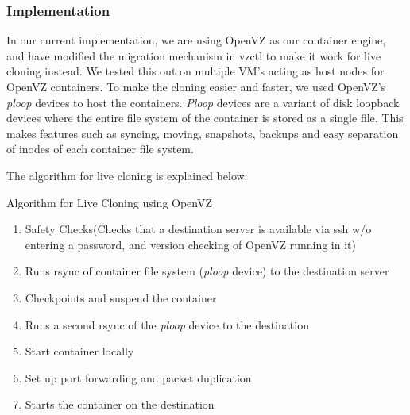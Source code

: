 
\subsubsection{Implementation}
In our current implementation, we are using OpenVZ\cite{openvz} as our container engine, and have modified the migration mechanism in vzctl \cite{vzctl} to make it work for live cloning instead. 
We tested this out on multiple VM's acting as host nodes for OpenVZ containers. 
To make the cloning easier and faster, we used OpenVZ's \textit{ploop} devices \cite{ploop} to host the containers. 
\textit{Ploop} devices are a variant of disk loopback devices where the entire file system of the container is stored as a single file. 
This makes features such as syncing, moving, snapshots, backups and easy separation of inodes of each container file system.

The algorithm for live cloning is explained below: 

\begin{algorithm}[ht]
\begin{algorithmic}
   \caption{Algorithm for Live Cloning using OpenVZ 
   \label{algCloning}}
 \begin{enumerate}
   \item Safety Checks(Checks that a destination server is available via ssh w/o entering a password, and version checking of OpenVZ running in it) 
   \item Runs rsync of container file system (\textit{ploop} device) to the destination server  
   \item Checkpoints and suspend the container 
   \item Runs a second rsync of the \textit{ploop} device to the destination  
   \item Start container locally 
   \item Set up port forwarding and packet duplication
   \item Starts the container on the destination 
  \end{enumerate}
\end{algorithmic}
\end{algorithm}

